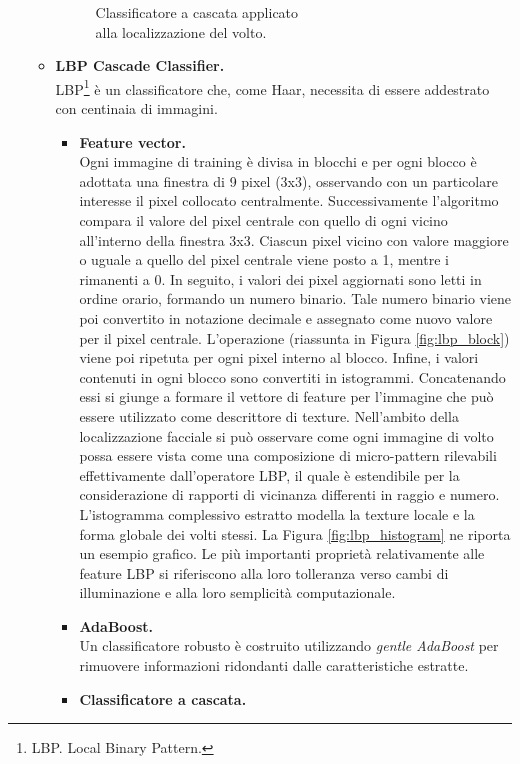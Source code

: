 \documentclass[12pt]{article}
\begin{document}
\begin{itemize}
\begin{itemize}
\begin{figure}[!htb]
			\caption{Classificatore a cascata applicato\\alla localizzazione del volto.}
			\label{fig:cascade_classifier}
		\end{figure}
		\vspace{0.5cm}
		\item \textbf{LBP Cascade Classifier.}\\
		LBP\footnote{LBP. Local Binary Pattern.}\cite{Lbp1}\cite{Lbp2} è un classificatore che, come Haar, necessita di essere addestrato con centinaia di immagini.
		\begin{itemize}
			\item \textbf{Feature vector.}\\
			Ogni immagine di training è divisa in blocchi e per ogni blocco è adottata una finestra di 9 pixel (3x3), osservando con un particolare interesse il pixel collocato centralmente. Successivamente l'algoritmo compara il valore del pixel centrale con quello di ogni vicino all'interno della finestra 3x3. Ciascun pixel vicino con valore maggiore o uguale a quello del pixel centrale viene posto a 1, mentre i rimanenti a 0. In seguito, i valori dei pixel aggiornati sono letti in ordine orario, formando un numero binario. Tale numero binario viene poi convertito in notazione decimale e assegnato come nuovo valore per il pixel centrale. L'operazione (riassunta in Figura \ref{fig:lbp_block}) viene poi ripetuta per ogni pixel interno al blocco. Infine, i valori contenuti in ogni blocco sono convertiti in istogrammi. Concatenando essi si giunge a formare il vettore di feature per l'immagine che può essere utilizzato come descrittore di texture. Nell'ambito della localizzazione facciale si può osservare come ogni immagine di volto possa essere vista come una composizione di micro-pattern rilevabili effettivamente dall'operatore LBP, il quale è estendibile per la considerazione di rapporti di vicinanza differenti in raggio e numero. L'istogramma complessivo estratto modella la texture locale e la forma globale dei volti stessi. La Figura \ref{fig:lbp_histogram} ne riporta un esempio grafico. Le più importanti proprietà relativamente alle feature LBP si riferiscono alla loro tolleranza verso cambi di illuminazione e alla loro semplicità computazionale.
			\item \textbf{AdaBoost.}\\
			Un classificatore robusto è costruito utilizzando \textit{gentle AdaBoost} per rimuovere informazioni ridondanti dalle caratteristiche estratte.
			\item \textbf{Classificatore a cascata.}\\

\end{itemize}
\end{itemize}
\end{itemize}
\end{document}
